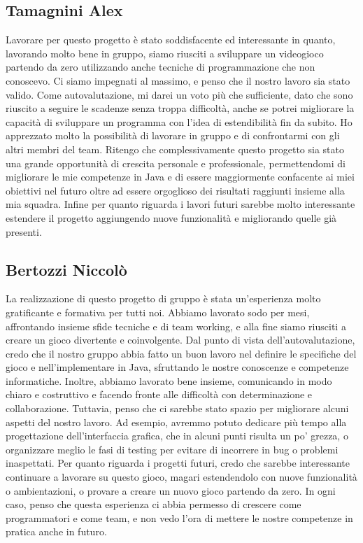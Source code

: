\documentclass[a4paper,12pt]{report}
\begin{document}
\subsection*{Tamagnini Alex}
Lavorare per questo progetto è stato soddisfacente ed interessante in quanto, lavorando molto bene in gruppo, siamo riusciti a sviluppare un videogioco partendo da zero utilizzando anche tecniche di programmazione che non conoscevo. Ci siamo impegnati al massimo, e penso che il nostro lavoro sia stato valido.
Come autovalutazione, mi darei un voto più che sufficiente, dato che sono riuscito a seguire le scadenze senza troppa difficoltà, anche se potrei migliorare la capacità di sviluppare un programma con l'idea di estendibilità fin da subito.
Ho apprezzato molto la possibilità di lavorare in gruppo e di confrontarmi con gli altri membri del team. Ritengo che complessivamente questo progetto sia stato una grande opportunità di crescita personale e professionale, permettendomi di migliorare le mie competenze in Java e di essere maggiormente confacente ai miei obiettivi nel futuro oltre ad essere orgoglioso dei risultati raggiunti insieme alla mia squadra.
Infine per quanto riguarda i lavori futuri sarebbe molto interessante estendere il progetto aggiungendo nuove funzionalità e migliorando quelle già presenti.

\subsection*{Bertozzi Niccolò}
La realizzazione di questo progetto di gruppo è stata un'esperienza molto gratificante e formativa per tutti noi. Abbiamo lavorato sodo per mesi, affrontando insieme sfide tecniche e di team working, e alla fine siamo riusciti a creare un gioco divertente e coinvolgente.
Dal punto di vista dell'autovalutazione, credo che il nostro gruppo abbia fatto un buon lavoro nel definire le specifiche del gioco e nell'implementare in Java, sfruttando le nostre conoscenze e competenze informatiche. Inoltre, abbiamo lavorato bene insieme, comunicando in modo chiaro e costruttivo e facendo fronte alle difficoltà con determinazione e collaborazione.
Tuttavia, penso che ci sarebbe stato spazio per migliorare alcuni aspetti del nostro lavoro. Ad esempio, avremmo potuto dedicare più tempo alla progettazione dell'interfaccia grafica, che in alcuni punti risulta un po' grezza, o organizzare meglio le fasi di testing per evitare di incorrere in bug o problemi inaspettati.
Per quanto riguarda i progetti futuri, credo che sarebbe interessante continuare a lavorare su questo gioco, magari estendendolo con nuove funzionalità o ambientazioni, o provare a creare un nuovo gioco partendo da zero. In ogni caso, penso che questa esperienza ci abbia permesso di crescere come programmatori e come team, e non vedo l'ora di mettere le nostre competenze in pratica anche in futuro.
\end{document}
